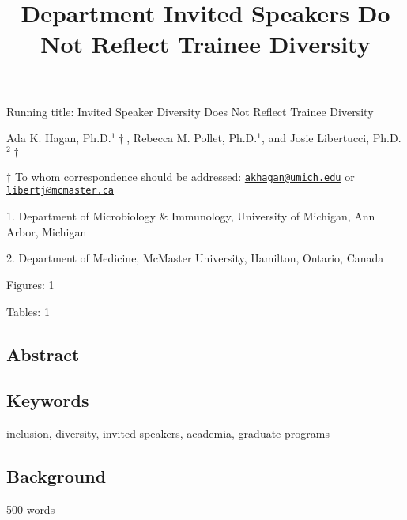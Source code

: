 \documentclass[10pt,]{article}
\title{\textbf{Department Invited Speakers Do Not Reflect Trainee Diversity}}
\author{}
\date{}
\begin{document}
\maketitle

\vspace{30mm}

Running title: Invited Speaker Diversity Does Not Reflect Trainee
Diversity

\vspace{35mm}

Ada K. Hagan, Ph.D.\({^1\dagger}\), Rebecca M. Pollet, Ph.D.\({^1}\),
and Josie Libertucci, Ph.D.\({^2\dagger}\)

\vspace{35mm}

\(\dagger\) To whom correspondence should be addressed:
\href{mailto:akhagan@umich.edu}{\nolinkurl{akhagan@umich.edu}} or
\href{mailto:libertj@mcmaster.ca}{\nolinkurl{libertj@mcmaster.ca}}

1. Department of Microbiology \& Immunology, University of Michigan, Ann
Arbor, Michigan

2. Department of Medicine, McMaster University, Hamilton, Ontario,
Canada

Figures: 1

Tables: 1

\newpage

\linenumbers

\subsection{Abstract}\label{abstract}

\subsection{Keywords}\label{keywords}

inclusion, diversity, invited speakers, academia, graduate programs

\newpage

\subsection{Background}\label{background}

500 words
\end{document}
